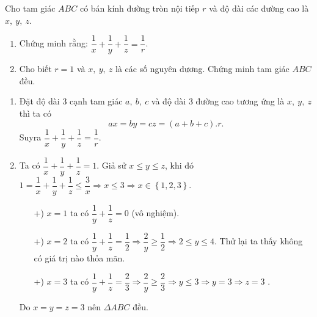 \begin{ex}%
\hfill    
     
     Cho tam giác $ABC$ có bán kính đường tròn nội tiếp $r$ và độ dài các đường cao là $x,\ y,\ z$.
     \begin{enumerate}
        \item Chứng minh rằng: $\dfrac{1}{x}+\dfrac{1}{y}+\dfrac{1}{z}=\dfrac{1}{r}$.
   \item Cho biết $r=1$ và $x,\ y,\ z$ là các số nguyên dương. Chứng minh tam giác $ABC$ đều.
\end{enumerate}      
       
\loigiai
    { \begin{enumerate}
    \item Đặt độ dài 3 cạnh tam giác $a,\ b,\ c$ và độ dài 3 đường cao tương ứng là $x,\ y,\ z$ thì ta có
$$ax=by=cz=(a+b+c).r.$$
 Suyra $\dfrac{1}{x}+\dfrac{1}{y}+\dfrac{1}{z}=\dfrac{1}{r}.$
\item Ta có $\dfrac{1}{x}+\dfrac{1}{y}+\dfrac{1}{z}=1.$ Giả sử $x\le y\le z$, khi đó 
$1=\dfrac{1}{x}+\dfrac{1}{y}+\dfrac{1}{z}\le \dfrac{3}{x}\Rightarrow x\le 3\Rightarrow x\in \left\{ 1,2,3 \right\}$.
\begin{itemize}
\item[+)] $x=1$ ta có $\dfrac{1}{y}+\dfrac{1}{z}=0$ (vô nghiệm).
\item[+)] $x=2$ ta có $\dfrac{1}{y}+\dfrac{1}{z}=\dfrac{1}{2}\Rightarrow \dfrac{2}{y}\ge \dfrac{1}{2}\Rightarrow 2\le y\le 4.$ Thử lại ta thấy không có giá trị nào thỏa mãn.
\item[+)] $x=3$ ta có $\dfrac{1}{y}+\dfrac{1}{z}=\dfrac{2}{3}\Rightarrow \dfrac{2}{y}\ge \dfrac{2}{3}\Rightarrow y\le 3\Rightarrow y=3\Rightarrow z=3$ .
\end{itemize}
Do $x=y=z=3$ nên $\Delta ABC$ đều.

    \end{enumerate}
        }
\end{ex}

